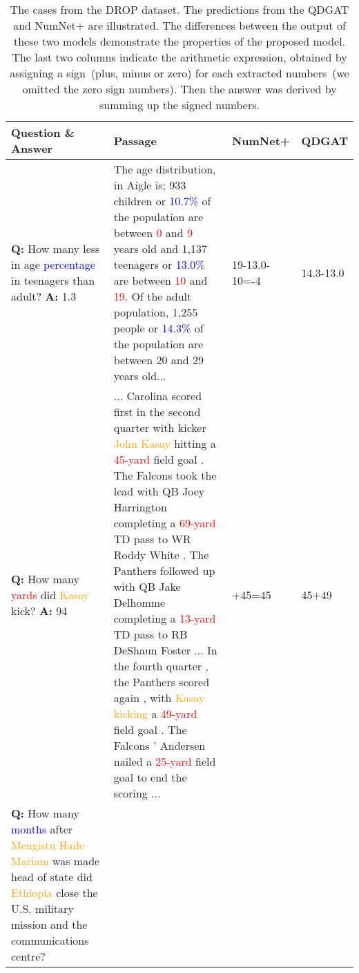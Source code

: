 \documentclass{article}
\begin{document}
\begin{table*}[!h]
\caption{The cases from the DROP dataset. The predictions from the QDGAT and NumNet+ are illustrated. The differences between the output of these two models demonstrate the properties of the proposed model. The last two columns indicate the arithmetic expression, obtained by assigning a sign~(plus, minus or zero) for each extracted numbers~(we omitted the zero sign numbers). Then the answer was derived by summing up the signed numbers.}
\label{examples-drop-table}
\vskip 0.15in
\begin{center}
\scriptsize
\begin{tabularx}{\linewidth}{JiKK}
\toprule
Question \& Answer & Passage & NumNet+ & QDGAT \\ \midrule
\textbf{Q:} How many less in  age \textcolor{blue}{percentage} in teenagers than adult? \newline
\textbf{A:} 1.3 & The age distribution, in Aigle is; 933 children or \textcolor{blue}{10.7\%} of the population are between \textcolor{red}{0} and \textcolor{red}{9} years old and 1,137 teenagers or \textcolor{blue}{13.0\%} are between \textcolor{red}{10} and \textcolor{red}{19}. Of the adult population, 1,255 people or \textcolor{blue}{14.3\%} of the population are between 20 and 29 years old... & 19-13.0-10=-4 & 14.3-13.0 \\ \midrule
\textbf{Q:} How many \textcolor{red}{yards} did \textcolor{orange}{Kasay} kick? \newline
\newline
\textbf{A:} 94 & ... Carolina scored first in the second quarter with kicker \textcolor{orange}{John Kasay} hitting a \textcolor{red}{45-yard} field goal . The Falcons took the lead with QB Joey Harrington completing a \textcolor{red}{69-yard} TD pass to WR Roddy White . The Panthers followed up with QB Jake Delhomme completing a \textcolor{red}{13-yard} TD pass to RB DeShaun Foster ... In the fourth quarter , the Panthers scored again , with \textcolor{orange}{Kasay kicking} a \textcolor{red}{49-yard} field goal . The Falcons ' Andersen nailed a \textcolor{red}{25-yard} field goal to end the scoring ...   & 
+45=45 &45+49 \\ \midrule
\textbf{Q:} How many \textcolor{blue}{months} after \textcolor{orange}{Mengistu Haile Mariam} was made head of state did \textcolor{orange}{Ethiopia} close the U.S. military mission and the communications centre?
 \newline

\end{tabularx}
\end{center}
\end{table*}
\end{document}
